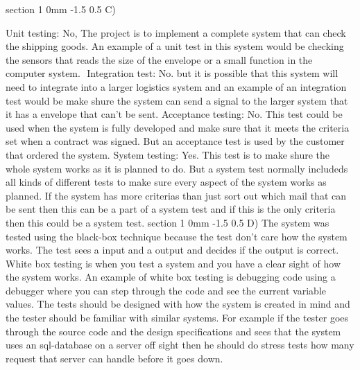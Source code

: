 \documentclass[a4paper,11pt]{article}
\makeatletter
\renewcommand{\section}{\@startsection
   {section}%
   {1}%
   {0mm}%
   {-1.5\baselineskip}%
   {0.5\baselineskip}%
   {\sffamily\bfseries\upshape\normalsize}}%
\makeatother
\begin{document}
\section{C)}

Unit testing: No, The project is to implement a complete system that can check the shipping goods. An example of a unit test in this system would be checking the sensors that reads the size of the envelope or a small function in the computer system. 
\newline
‌\newline
Integration test: No. but it is possible that this system will need to integrate into a larger logistics system and an example of an integration test would be make shure the system can send a signal to the larger system that it has a envelope that can't be sent.
\newline
\newline
Acceptance testing: No. This test could be used when the system is fully developed and make sure that it meets the criteria set when a contract was signed. But an acceptance test is used by the customer that ordered the system.
\newline
\newline
System testing: Yes. This test is to make shure the whole system works as it is planned to do. But a system test normally includeds all kinds of different tests to make sure every aspect of the system works as planned. If the system has more criterias than just sort out which mail that can be sent then this can be a part of a system test and if this is the only criteria then this could be a system test.
\section{D)}
The system was tested using the black-box technique because the test don't care how the system works. The test sees a input and a output and decides if the output is correct.
White box testing is when you test a system and you have a clear sight of how the system works. An example of white box testing is debugging code using a debugger where you can step through the code and see the current variable values. The tests should be designed with how the system is created in mind and the tester should be familiar with similar systems. For example if the tester goes through the source code and the design specifications and sees that the system uses an sql-database on a server off sight then he should do stress tests how many request that server can handle before it goes down. 
\end{document}
